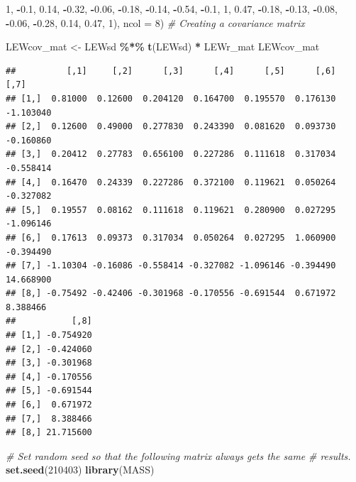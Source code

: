 \documentclass[
  11pt,
]{book}
\newenvironment{Shaded}{\begin{snugshade}}{\end{snugshade}}
\newcommand{\AttributeTok}[1]{\textcolor[rgb]{0.27,0.27,0.27}{#1}}
\newcommand{\CommentTok}[1]{\textcolor[rgb]{0.37,0.37,0.37}{\textit{#1}}}
\newcommand{\DecValTok}[1]{\textcolor[rgb]{0.06,0.06,0.06}{#1}}
\newcommand{\FloatTok}[1]{\textcolor[rgb]{0.06,0.06,0.06}{#1}}
\newcommand{\FunctionTok}[1]{\textcolor[rgb]{0.27,0.27,0.27}{\textbf{#1}}}
\newcommand{\NormalTok}[1]{#1}
\newcommand{\OtherTok}[1]{\textcolor[rgb]{0.37,0.37,0.37}{#1}}
\newcommand{\SpecialCharTok}[1]{\textcolor[rgb]{0.43,0.43,0.43}{\textbf{#1}}}
\begin{document}
\begin{Shaded}
\begin{Highlighting}[]
    \DecValTok{1}\NormalTok{, }\SpecialCharTok{{-}}\FloatTok{0.1}\NormalTok{, }\FloatTok{0.14}\NormalTok{, }\SpecialCharTok{{-}}\FloatTok{0.32}\NormalTok{, }\SpecialCharTok{{-}}\FloatTok{0.06}\NormalTok{, }\SpecialCharTok{{-}}\FloatTok{0.18}\NormalTok{, }\SpecialCharTok{{-}}\FloatTok{0.14}\NormalTok{, }\SpecialCharTok{{-}}\FloatTok{0.54}\NormalTok{, }\SpecialCharTok{{-}}\FloatTok{0.1}\NormalTok{, }\DecValTok{1}\NormalTok{, }\FloatTok{0.47}\NormalTok{, }\SpecialCharTok{{-}}\FloatTok{0.18}\NormalTok{,}
    \SpecialCharTok{{-}}\FloatTok{0.13}\NormalTok{, }\SpecialCharTok{{-}}\FloatTok{0.08}\NormalTok{, }\SpecialCharTok{{-}}\FloatTok{0.06}\NormalTok{, }\SpecialCharTok{{-}}\FloatTok{0.28}\NormalTok{, }\FloatTok{0.14}\NormalTok{, }\FloatTok{0.47}\NormalTok{, }\DecValTok{1}\NormalTok{), }\AttributeTok{ncol =} \DecValTok{8}\NormalTok{)}
\CommentTok{\# Creating a covariance matrix}

\NormalTok{LEWcov\_mat }\OtherTok{\textless{}{-}}\NormalTok{ LEWsd }\SpecialCharTok{\%*\%} \FunctionTok{t}\NormalTok{(LEWsd) }\SpecialCharTok{*}\NormalTok{ LEWr\_mat}
\NormalTok{LEWcov\_mat}
\end{Highlighting}
\end{Shaded}

\begin{verbatim}
##          [,1]     [,2]      [,3]      [,4]      [,5]      [,6]      [,7]
## [1,]  0.81000  0.12600  0.204120  0.164700  0.195570  0.176130 -1.103040
## [2,]  0.12600  0.49000  0.277830  0.243390  0.081620  0.093730 -0.160860
## [3,]  0.20412  0.27783  0.656100  0.227286  0.111618  0.317034 -0.558414
## [4,]  0.16470  0.24339  0.227286  0.372100  0.119621  0.050264 -0.327082
## [5,]  0.19557  0.08162  0.111618  0.119621  0.280900  0.027295 -1.096146
## [6,]  0.17613  0.09373  0.317034  0.050264  0.027295  1.060900 -0.394490
## [7,] -1.10304 -0.16086 -0.558414 -0.327082 -1.096146 -0.394490 14.668900
## [8,] -0.75492 -0.42406 -0.301968 -0.170556 -0.691544  0.671972  8.388466
##           [,8]
## [1,] -0.754920
## [2,] -0.424060
## [3,] -0.301968
## [4,] -0.170556
## [5,] -0.691544
## [6,]  0.671972
## [7,]  8.388466
## [8,] 21.715600
\end{verbatim}

\begin{Shaded}
\begin{Highlighting}[]
\CommentTok{\# Set random seed so that the following matrix always gets the same}
\CommentTok{\# results.}
\FunctionTok{set.seed}\NormalTok{(}\DecValTok{210403}\NormalTok{)}
\FunctionTok{library}\NormalTok{(MASS)}
\end{Highlighting}
\end{Shaded}
\end{document}

